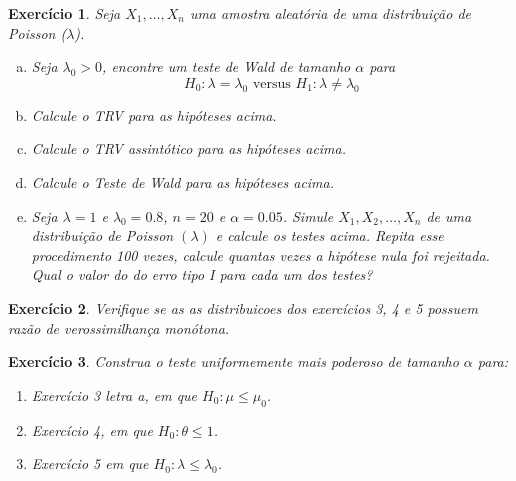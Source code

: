 \documentclass[letter,11pt]{article}
\newtheorem{exer}{Exercício}
\begin{document}
\begin{exer} \rm
Seja $X_1, \ldots, X_n$ uma amostra aleatória de uma distribuição de Poisson ($\lambda$).
  \begin{enumerate}[a)]
    \item Seja $\lambda_0>0$, encontre um teste de Wald de tamanho $\alpha$ para
$$
H_0: \lambda=\lambda_0  \mbox{ versus } H_1: \lambda \neq \lambda_0
$$

    \item Calcule o TRV para as hipóteses acima.

    \item Calcule o TRV assintótico para as hipóteses acima. 
  
    \item Calcule o Teste de Wald para as hipóteses acima.

    \item Seja $\lambda=1$ e $\lambda_0=0.8$, $n=20$ e $\alpha=0.05$. Simule $X_1, X_2, \ldots, X_n$ de uma distribuição de Poisson $(\lambda)$ e calcule os testes acima. Repita esse procedimento 100 vezes, calcule quantas vezes a hipótese nula foi rejeitada. Qual o valor do do erro tipo I para cada um dos testes?
\end{enumerate}
\end{exer}


\begin{exer} \rm
Verifique se as as distribuicoes dos exercícios 3, 4 e 5 possuem razão de verossimilhança monótona. 
\end{exer}


\begin{exer} \rm
Construa o teste uniformemente mais poderoso de tamanho $\alpha$ para:

  \begin{enumerate}
    \item Exercício 3 letra a, em que $H_0: \mu \leq \mu_0$.
    
    \item Exercício 4, em que $H_0: \theta \leq 1$.
    
    \item Exercício 5 em que $H_0: \lambda \leq \lambda_0$.
  \end{enumerate}
\end{exer}
\end{document}
